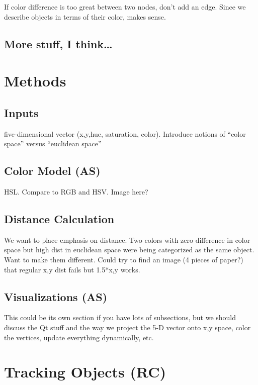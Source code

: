 \documentclass{article}
\begin{document}
If color difference is too great between two nodes, don't add an edge. Since we describe objects in terms of their color, makes sense.

\subsection{More stuff, I think\dots}

\section{Methods}

\subsection{Inputs}

five-dimensional vector (x,y,hue, saturation, color). Introduce notions of ``color space'' versus ``euclidean space''

\subsection{Color Model (AS)}

HSL. Compare to RGB and HSV. Image here?

\subsection{Distance Calculation}

We want to place emphasis on distance. Two colors with zero difference in color space but high dist in euclidean space were being categorized as the same object. Want to make them different. Could try to find an image (4 pieces of paper?) that regular x,y dist fails but 1.5*x,y works.

\subsection{Visualizations (AS)}

This could be its own section if you have lots of subsections, but we should discuss the Qt stuff and the way we project the 5-D vector onto x,y space, color the vertices, update everything dynamically, etc.

\section{Tracking Objects (RC)}
\end{document}
